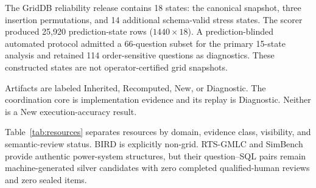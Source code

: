 \documentclass[applsci,article,submit,moreauthors]{Definitions/mdpi}
\begin{document}
The GridDB reliability release contains 18 states: the canonical snapshot, three insertion permutations, and 14 additional schema-valid stress states. The scorer produced 25,920 prediction-state rows ($1440\times18$). A prediction-blinded automated protocol admitted a 66-question subset for the primary 15-state analysis and retained 114 order-sensitive questions as diagnostics. These constructed states are not operator-certified grid snapshots.

Artifacts are labeled Inherited, Recomputed, New, or Diagnostic. The coordination core is implementation evidence and its replay is Diagnostic. Neither is a New execution-accuracy result.

Table~\ref{tab:resources} separates resources by domain, evidence class, visibility, and semantic-review status. BIRD is explicitly non-grid. RTS-GMLC and SimBench provide authentic power-system structures, but their question--SQL pairs remain machine-generated silver candidates with zero completed qualified-human reviews and zero sealed items.

\begin{table}[htbp]
\caption{Data-resource scope and evidence status. Counts describe retained local artifacts; they are not interchangeable benchmark denominators.}
\label{tab:resources}
\centering
\small
\setlength{\tabcolsep}{3pt}
\end{table}
\end{document}
